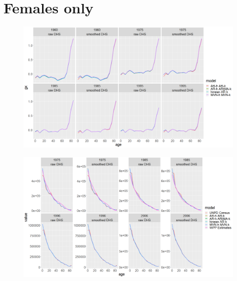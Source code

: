 \documentclass[12pt,a4paper]{article}
\begin{document}
\section*{\centering Females only}
\begin{figure}[H]
\includegraphics[width = \linewidth]{Burkina Faso/7/female mig.png}
\end{figure}
\begin{figure}[H]
\includegraphics[width = \linewidth]{Burkina Faso/7/female period pop.png}
\end{figure}

\newpage
\end{document}
